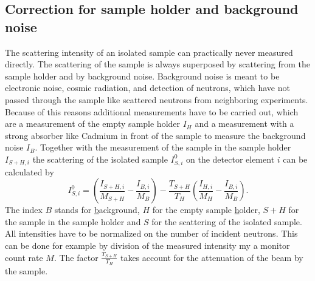 \subsection{Correction for sample holder and background noise}
The scattering intensity of an isolated sample can practically never
measured directly. The scattering of the sample is always superposed
by scattering from the sample holder and by background noise. Background noise
is meant to be electronic noise, cosmic radiation, and detection of neutrons, which
have not passed through the sample like scattered neutrons from neighboring experiments.
Because of this reasons additional measurements have to be carried out, which are
a measurement of the empty sample holder $I_H$ and a measurement with a strong
absorber like Cadmium in front of the sample to measure the background noise $I_B$.
Together with the measurement of the sample in the sample holder $I_{S+H,i}$
 the scattering of the isolated sample $I^0_{S,i}$ on the detector element $i$ can
 be calculated by
\begin{equation}
I_{S,i}^0 = \left( \frac{I_{S+H,i}}{M_{S+H}} - \frac{I_{B,i}}{M_B} \right)
-
\frac{T_{S+H}}{T_H} \left(\frac{I_{H,i}}{M_{H}} - \frac{I_{B,i}}{M_B} \right) .
\label{dsdoexp}
\end{equation}
The index $B$ stands for \uline{b}ackground, $H$
for the empty sample \uline{h}older, $S+H$ for the sample in the sample holder and $S$
for the scattering of the isolated sample.
All intensities have to be normalized on the number of incident neutrons. This can be done
for example by division of the measured intensity my a monitor count rate $M$.
The factor $ \frac{T_{S+H}}{T_H}$ takes account for the attenuation of the beam by the sample.

